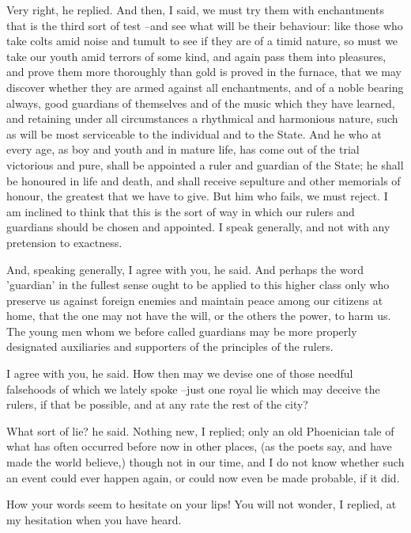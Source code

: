 Very right, he replied.
And then, I said, we must try them with enchantments that is the third sort of test --and see what will be their behaviour: like those who take colts amid noise and tumult to see if they are of a timid nature, so must we take our youth amid terrors of some kind, and again pass them into pleasures, and prove them more thoroughly than gold is proved in the furnace, that we may discover whether they are armed against all enchantments, and of a noble bearing always, good guardians of themselves and of the music which they have learned, and retaining under all circumstances a rhythmical and harmonious nature, such as will be most serviceable to the individual and to the State. And he who at every age, as boy and youth and in mature life, has come out of the trial victorious and pure, shall be appointed a ruler and guardian of the State; he shall be honoured in life and death, and shall receive sepulture and other memorials of honour, the greatest that we have to give. But him who fails, we must reject. I am inclined to think that this is the sort of way in which our rulers and guardians should be chosen and appointed. I speak generally, and not with any pretension to exactness.

And, speaking generally, I agree with you, he said.
And perhaps the word 'guardian' in the fullest sense ought to be applied to this higher class only who preserve us against foreign enemies and maintain peace among our citizens at home, that the one may not have the will, or the others the power, to harm us. The young men whom we before called guardians may be more properly designated auxiliaries and supporters of the principles of the rulers.

I agree with you, he said.
How then may we devise one of those needful falsehoods of which we lately spoke --just one royal lie which may deceive the rulers, if that be possible, and at any rate the rest of the city?

What sort of lie? he said.
Nothing new, I replied; only an old Phoenician tale of what has often occurred before now in other places, (as the poets say, and have made the world believe,) though not in our time, and I do not know whether such an event could ever happen again, or could now even be made probable, if it did.

How your words seem to hesitate on your lips!
You will not wonder, I replied, at my hesitation when you have heard.

